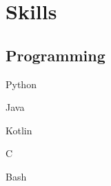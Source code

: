 \documentclass[]{resume}
\begin{document}
\begin{minipage}[t]{0.25\textwidth}
%


\section{Skills}
\subsection{Programming}
\begin{itemize*}
 \item Python
 \item Java
 \item Kotlin
 \item C
 \item Bash
\end{itemize*}
\subsectionsep


\end{minipage}
\end{document}

